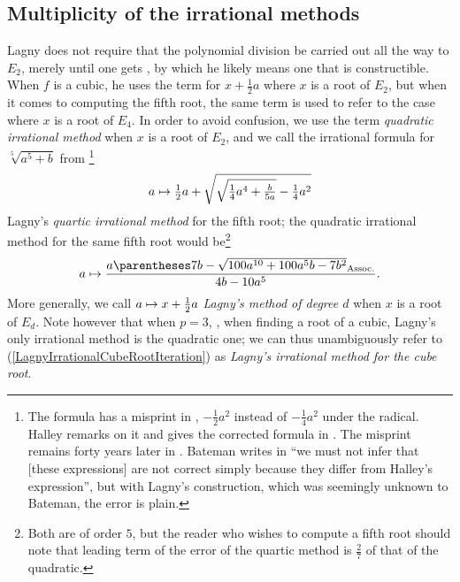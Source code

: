 ﻿\documentclass[10pt, a4paper, twoside]{basestyle}
\begin{document}
\subsection*{Multiplicity of the irrational methods}
Lagny does not require that the polynomial division be carried out
all the way to $E_2$, merely until one gets , by which he likely means
one that is constructible. When $f$ is a cubic, he uses the term  for $x+\frac{1}{2}a$ where
$x$ is a root of $E_2$, but when it comes to computing the fifth root, the same term is used to refer to the case where $x$ is a root of
$E_4$. In order to avoid confusion, we use the term \emph{quadratic irrational method} when $x$ is a root of $E_2$,
and we call the irrational formula for $\sqrt[5]{a^5+b}$ from \cite[43]{FantetdeLagny1692}\footnote{The formula has a misprint in
\cite[43]{FantetdeLagny1692}, $-\tfrac{1}{2}a^2$ instead of $-\tfrac{1}{4}a^2$ under the radical.
Halley remarks on it and gives the corrected formula in \cite[137,140]{Halley1694}.
The misprint remains forty years later in \cite[\pno~440 misnumbered 340]{FantetdeLagny1733}.
Bateman writes in \cite{Bateman1938} ``we must not infer that [these expressions] are not correct simply because
they differ from Halley's expression'', but with Lagny's construction, which was seemingly unknown to Bateman, the
error is plain.}\[
\FunctionBody{a}{\tfrac{1}{2}a+\sqrt{\sqrt{\tfrac{1}{4}a^4+\tfrac{b}{5a}}-\tfrac{1}{4}a^2}}
\]
Lagny's \emph{quartic irrational method} for the fifth root;
the quadratic irrational method for the same fifth root would be\footnote{Both are of order $5$, but the reader who wishes
to compute a fifth root should note that leading term of the error of the quartic method is
$\frac{2}{7}$ of that of the quadratic.}\[
\FunctionBody{a}{\frac{a\pa{7b-\sqrt{100a^{10}+100a^{5}b-7b^2}}}{4b-10a^5}}\text.
\]
More generally, we call $\FunctionBody{a}{x+\frac{1}{2}a}$ \emph{Lagny's method of degree $d$} when
$x$ is a root of $E_{d}$.
Note however that when $p=3$, \idest, when finding a root of a cubic, Lagny's only irrational method
is the quadratic one; we can thus unambiguously refer to (\ref{LagnyIrrationalCubeRootIteration}) as \emph{Lagny's irrational method for the cube root}.
\end{document}
